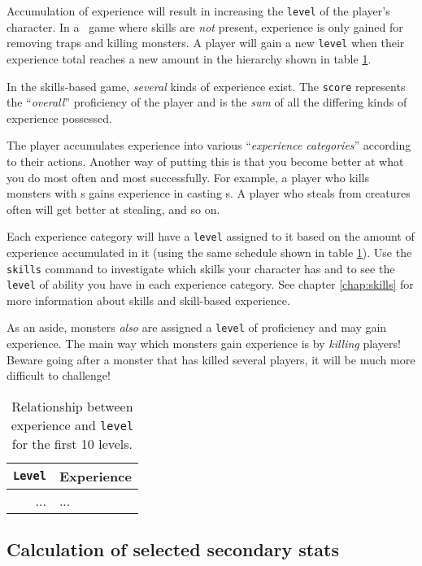Accumulation of experience will result in increasing the {\tt level} of the
player's character. In a \cf\ game where skills are {\em not} present,
experience is only gained for removing traps and killing monsters.
A player will gain a new {\tt level} when their
experience total reaches a new amount in the hierarchy shown
in table \ref{tab:exp_level}.

In the skills-based game, {\em several} kinds of experience exist. The
{\tt score} represents the ``{\em overall}'' proficiency of the player
and is the
{\em sum} of all the differing kinds of experience possessed.

The player accumulates experience into various ``{\em experience
categories}'' according to their actions.
Another way of putting this is that you become better
at what you do most often and most successfully. For example,
a player who kills monsters with \incantation s gains experience in
casting \incantation s. A player who steals from creatures often will
get better at stealing, and so on.

Each experience category will have a {\tt level} assigned to it based on
the amount of experience accumulated in it (using the same schedule
 shown in table
\ref{tab:exp_level}). Use the {\tt skills} command to
investigate which skills your character has and to see the {\tt level} of
ability you have in each experience category. See chapter
\ref{chap:skills} for more information about skills and skill-based
experience.

As an aside, monsters {\em also} are assigned a {\tt level} of proficiency
and may gain experience. The main way which monsters gain experience
is by {\em killing} players! Beware going after a monster that has
killed several players, it will be much more difficult to challenge!

\begin{table}
\begin{center}
\caption{Relationship between experience and {\tt level} for the first
10 levels. \label{tab:exp_level}}
\vskip 12pt
\small
\begin{tabular}{|rl|}
\hline
{\tt Level}	& \multicolumn{1}{c|}{Experience} \\ \hline\hline

... & ... \\
\hline
\end{tabular}
\end{center}
\end{table}

\subsection{Calculation of selected secondary stats}\label{sec:stat_calc}

